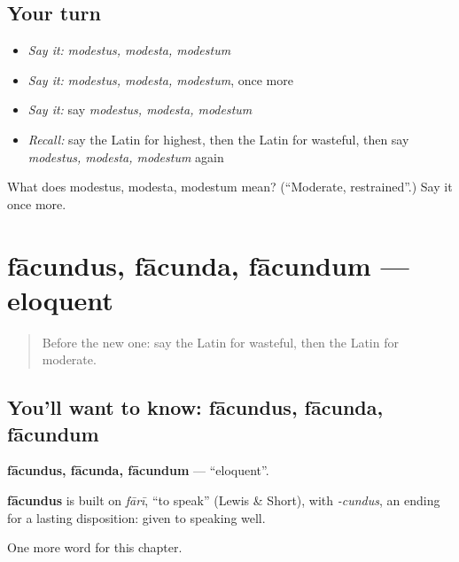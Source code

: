 \subsection*{Your turn}
\begin{itemize}
\raggedright
  \item \emph{Say it:} \emph{modestus, modesta, modestum}
  \item \emph{Say it:} \emph{modestus, modesta, modestum}, once more
  \item \emph{Say it:} say \emph{modestus, modesta, modestum}
  \item \emph{Recall:} say the Latin for highest, then the Latin for wasteful, then say \emph{modestus, modesta, modestum} again
\end{itemize}

\begin{tcolorbox}[breakable,colback=teal!4,colframe=teal!35!black,title={Before you move on}]
What does modestus, modesta, modestum mean? (\textquotedblleft{}Moderate, restrained\textquotedblright{}.) Say it once more.
\end{tcolorbox}
\section[fācundus, fācunda, fācundum]{fācundus, fācunda, fācundum — eloquent}

\label{lesson:LA-C184-facundus}



\begin{quote}
Before the new one: say the Latin for wasteful, then the Latin for moderate.
\end{quote}

\subsection*{You'll want to know: fācundus, fācunda, fācundum}
\textbf{fācundus, fācunda, fācundum} — \textquotedblleft{}eloquent\textquotedblright{}.

\begin{cousinweb}
\textbf{fācundus} is built on \emph{fārī}, \textquotedblleft{}to speak\textquotedblright{} (Lewis \& Short), with \emph{-cundus}, an ending for a lasting disposition: given to speaking well.
\end{cousinweb}

\begin{grammarlens}[title={What you've built}]
One more word for this chapter.
\end{grammarlens}

